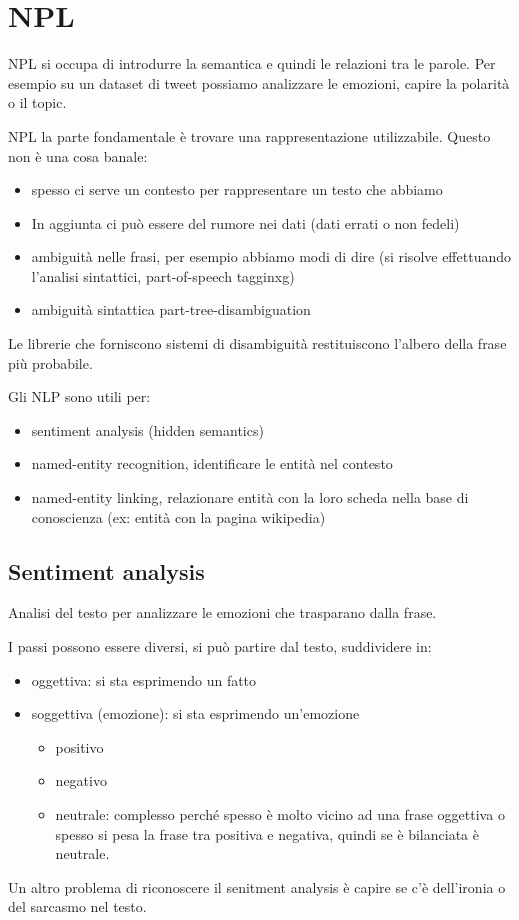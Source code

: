 \chapter{NPL}

NPL si occupa di introdurre la semantica e quindi le relazioni tra le parole.
Per esempio su un dataset di tweet possiamo analizzare le emozioni, capire la polarità
o il topic.

NPL la parte fondamentale è trovare una rappresentazione utilizzabile. Questo non è
una cosa banale:
\begin{itemize}
    \item spesso ci serve un contesto per rappresentare un testo che abbiamo
    \item In aggiunta ci può essere del rumore nei dati (dati errati o non fedeli)
    \item ambiguità nelle frasi, per esempio abbiamo modi di dire 
    (si risolve effettuando l'analisi sintattici, part-of-speech tagginxg)
    \item ambiguità sintattica part-tree-disambiguation
\end{itemize} 

Le librerie che forniscono sistemi di disambiguità restituiscono l'albero della 
frase più probabile. 

Gli NLP sono utili per:
\begin{itemize}
    \item sentiment analysis (hidden semantics)
    \item named-entity recognition, identificare le entità nel contesto
    \item named-entity linking, relazionare entità con la loro scheda nella base 
    di conoscienza (ex: entità con la pagina wikipedia)
\end{itemize}

\section{Sentiment analysis}

\begin{definizione}
    Analisi del testo per analizzare le emozioni che trasparano dalla frase.
\end{definizione}

I passi possono essere diversi, si può partire dal testo, suddividere in:
\begin{itemize}
    \item oggettiva: si sta esprimendo un fatto
    \item soggettiva (emozione): si sta esprimendo un'emozione 
    \begin{itemize}
        \item positivo
        \item negativo
        \item neutrale: complesso perché spesso è molto vicino ad una frase oggettiva o
        spesso si pesa la frase tra positiva e negativa, quindi se è bilanciata è neutrale.
    \end{itemize}
\end{itemize}
Un altro problema di riconoscere il senitment analysis è capire se c'è dell'ironia
o del sarcasmo nel testo.

